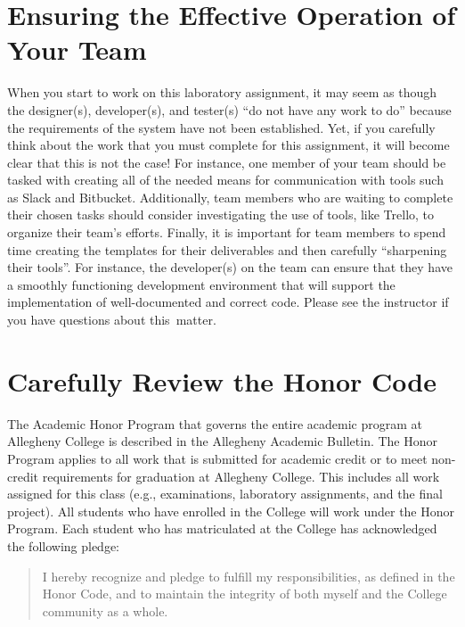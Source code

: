 \section*{Ensuring the Effective Operation of Your Team}

When you start to work on this laboratory assignment, it may seem as though the designer(s), developer(s), and tester(s)
``do not have any work to do'' because the requirements of the system have not been established. Yet, if you carefully
think about the work that you must complete for this assignment, it will become clear that this is not the case! For
instance, one member of your team should be tasked with creating all of the needed means for communication with tools
such as Slack and Bitbucket. Additionally, team members who are waiting to complete their chosen tasks should consider
investigating the use of tools, like Trello, to organize their team's efforts. Finally, it is important for team
members to spend time creating the templates for their deliverables and then carefully ``sharpening their tools''. For
instance, the developer(s) on the team can ensure that they have a smoothly functioning development environment that
will support the implementation of well-documented and correct code. Please see the instructor if you have questions
about \mbox{this matter}.

\section*{Carefully Review the Honor Code}

The Academic Honor Program that governs the entire academic program at Allegheny College is described in the Allegheny
Academic Bulletin.  The Honor Program applies to all work that is submitted for academic credit or to meet non-credit
requirements for graduation at Allegheny College.  This includes all work assigned for this class (e.g., examinations,
  laboratory assignments, and the final project).  All students who have enrolled in the College will work under the Honor
Program.  Each student who has matriculated at the College has acknowledged the following pledge:

\vspace*{-.05in}
\begin{quote}
  I hereby recognize and pledge to fulfill my responsibilities, as defined in the Honor Code, and to maintain the
  integrity of both myself and the College community as a whole.
\end{quote}
\vspace*{-.05in}

